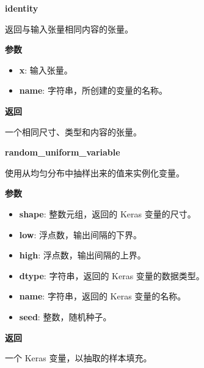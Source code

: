 \textbf{identity}\label{identity}

\begin{Shaded}
\begin{Highlighting}[]
\OperatorTok{=}\NormalTok{)}
\end{Highlighting}
\end{Shaded}

返回与输入张量相同内容的张量。

\textbf{参数}

\begin{itemize}
\tightlist
\item
  \textbf{x}: 输入张量。
\item
  \textbf{name}: 字符串，所创建的变量的名称。
\end{itemize}

\textbf{返回}

一个相同尺寸、类型和内容的张量。


\textbf{random\_uniform\_variable}\label{randomux5funiformux5fvariable}

\begin{Shaded}
\begin{Highlighting}[]
\OperatorTok{=}\OperatorTok{=}\OperatorTok{=}\NormalTok{)}
\end{Highlighting}
\end{Shaded}

使用从均匀分布中抽样出来的值来实例化变量。

\textbf{参数}

\begin{itemize}
\tightlist
\item
  \textbf{shape}: 整数元组，返回的 Keras 变量的尺寸。
\item
  \textbf{low}: 浮点数，输出间隔的下界。
\item
  \textbf{high}: 浮点数，输出间隔的上界。
\item
  \textbf{dtype}: 字符串，返回的 Keras 变量的数据类型。
\item
  \textbf{name}: 字符串，返回的 Keras 变量的名称。
\item
  \textbf{seed}: 整数，随机种子。
\end{itemize}

\textbf{返回}

一个 Keras 变量，以抽取的样本填充。

